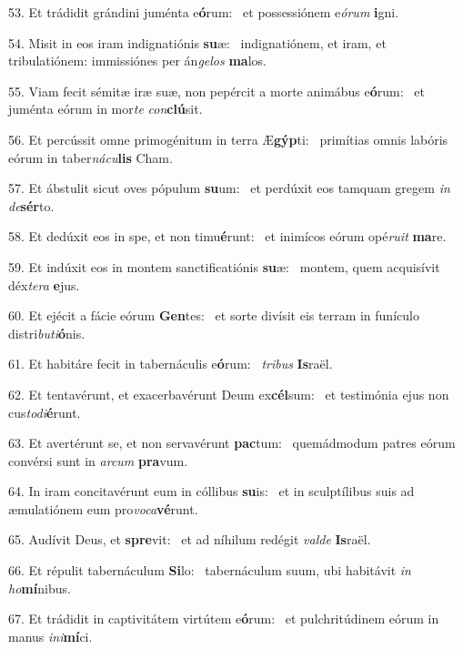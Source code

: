 53. Et trádidit grándini juménta e\textbf{ó}rum: \ast\  et possessiónem e\textit{ó}\textit{rum} \textbf{i}gni.\

54. Misit in eos iram indignatiónis \textbf{su}æ: \ast\  indignatiónem, et iram, et tribulatiónem: immissiónes per án\textit{ge}\textit{los} \textbf{ma}los.\

55. Viam fecit sémitæ iræ suæ, non pepércit a morte animábus e\textbf{ó}rum: \ast\  et juménta eórum in mor\textit{te} \textit{con}\textbf{clú}sit.\

56. Et percússit omne primogénitum in terra Æ\textbf{gýp}ti: \ast\  primítias omnis labóris eórum in taber\textit{ná}\textit{cu}\textbf{lis} Cham.\

57. Et ábstulit sicut oves pópulum \textbf{su}um: \ast\  et perdúxit eos tamquam gregem \textit{in} \textit{de}\textbf{sér}to.\

58. Et dedúxit eos in spe, et non timu\textbf{é}runt: \ast\  et inimícos eórum opé\textit{ru}\textit{it} \textbf{ma}re.\

59. Et indúxit eos in montem sanctificatiónis \textbf{su}æ: \ast\  montem, quem acquisívit déx\textit{te}\textit{ra} \textbf{e}jus.\

60. Et ejécit a fácie eórum \textbf{Gen}tes: \ast\  et sorte divísit eis terram in funículo distri\textit{bu}\textit{ti}\textbf{ó}nis.\

61. Et habitáre fecit in tabernáculis e\textbf{ó}rum: \ast\  \textit{tri}\textit{bus} \textbf{Is}raël.\

62. Et tentavérunt, et exacerbavérunt Deum ex\textbf{cél}sum: \ast\  et testimónia ejus non cus\textit{to}\textit{di}\textbf{é}runt.\

63. Et avertérunt se, et non servavérunt \textbf{pac}tum: \ast\  quemádmodum patres eórum convérsi sunt in \textit{ar}\textit{cum} \textbf{pra}vum.\

64. In iram concitavérunt eum in cóllibus \textbf{su}is: \ast\  et in sculptílibus suis ad æmulatiónem eum pro\textit{vo}\textit{ca}\textbf{vé}runt.\

65. Audívit Deus, et \textbf{spre}vit: \ast\  et ad níhilum redégit \textit{val}\textit{de} \textbf{Is}raël.\

66. Et répulit tabernáculum \textbf{Si}lo: \ast\  tabernáculum suum, ubi habitávit \textit{in} \textit{ho}\textbf{mí}nibus.\

67. Et trádidit in captivitátem virtútem e\textbf{ó}rum: \ast\  et pulchritúdinem eórum in manus \textit{in}\textit{i}\textbf{mí}ci.\

